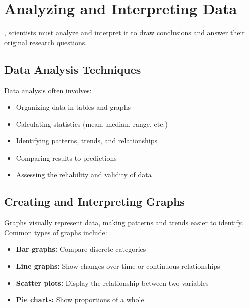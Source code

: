 
\section{Analyzing and Interpreting Data}

, scientists must analyze and interpret it to draw conclusions and answer their original research questions.

\subsection{Data Analysis Techniques}

Data analysis often involves:

\begin{itemize}
    \item Organizing data in tables and graphs
    \item Calculating statistics (mean, median, range, etc.)
    \item Identifying patterns, trends, and relationships
    \item Comparing results to predictions
    \item Assessing the reliability and validity of data
\end{itemize}


\subsection{Creating and Interpreting Graphs}

Graphs visually represent data, making patterns and trends easier to identify. Common types of graphs include:

\begin{itemize}
    \item \textbf{Bar graphs:} Compare discrete categories
    \item \textbf{Line graphs:} Show changes over time or continuous relationships
    \item \textbf{Scatter plots:} Display the relationship between two variables
    \item \textbf{Pie charts:} Show proportions of a whole
\end{itemize}

